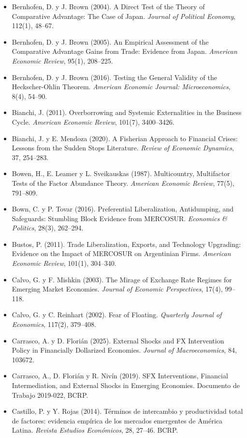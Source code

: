 \documentclass[11pt,a4paper]{article}
\begin{document}
{\begin{itemize}[leftmargin=1.4em,itemsep=1pt,label={}]
\item Bernhofen, D. y J. Brown (2004). A Direct Test of the Theory of Comparative Advantage: The Case of Japan. \emph{Journal of Political Economy}, 112(1), 48--67.
\item Bernhofen, D. y J. Brown (2005). An Empirical Assessment of the Comparative Advantage Gains from Trade: Evidence from Japan. \emph{American Economic Review}, 95(1), 208--225.
\item Bernhofen, D. y J. Brown (2016). Testing the General Validity of the Heckscher-Ohlin Theorem. \emph{American Economic Journal: Microeconomics}, 8(4), 54--90.
\item Bianchi, J. (2011). Overborrowing and Systemic Externalities in the Business Cycle. \emph{American Economic Review}, 101(7), 3400--3426.
\item Bianchi, J. y E. Mendoza (2020). A Fisherian Approach to Financial Crises: Lessons from the Sudden Stops Literature. \emph{Review of Economic Dynamics}, 37, 254--283.
\item Bowen, H., E. Leamer y L. Sveikauskas (1987). Multicountry, Multifactor Tests of the Factor Abundance Theory. \emph{American Economic Review}, 77(5), 791--809.
\item Bown, C. y P. Tovar (2016). Preferential Liberalization, Antidumping, and Safeguards: Stumbling Block Evidence from MERCOSUR. \emph{Economics \& Politics}, 28(3), 262--294.
\item Bustos, P. (2011). Trade Liberalization, Exports, and Technology Upgrading: Evidence on the Impact of MERCOSUR on Argentinian Firms. \emph{American Economic Review}, 101(1), 304--340.
\item Calvo, G. y F. Mishkin (2003). The Mirage of Exchange Rate Regimes for Emerging Market Economies. \emph{Journal of Economic Perspectives}, 17(4), 99--118.
\item Calvo, G. y C. Reinhart (2002). Fear of Floating. \emph{Quarterly Journal of Economics}, 117(2), 379--408.
\item Carrasco, A. y D. Florián (2025). External Shocks and FX Intervention Policy in Financially Dollarized Economies. \emph{Journal of Macroeconomics}, 84, 103672.
\item Carrasco, A., D. Florián y R. Nivín (2019). SFX Interventions, Financial Intermediation, and External Shocks in Emerging Economies. Documento de Trabajo 2019-022, BCRP.
\item Castillo, P. y Y. Rojas (2014). Términos de intercambio y productividad total de factores: evidencia empírica de los mercados emergentes de América Latina. \emph{Revista Estudios Económicos}, 28, 27--46. BCRP.

\end{itemize}}
\end{document}
